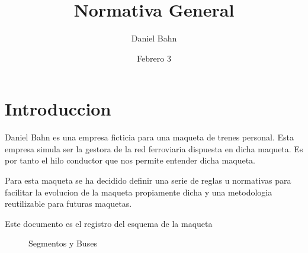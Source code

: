\documentclass{DccDiyTools/DccDiyTools}
\title{Normativa General}
\author{Daniel Bahn}
\date{Febrero 3}
\begin{document}
\maketitle
\newpage
\section{Introduccion}
Daniel Bahn es una empresa ficticia para una maqueta de trenes personal. Esta empresa simula ser la gestora de la red ferroviaria dispuesta en dicha maqueta.
Es por tanto el hilo conductor que nos permite entender dicha maqueta.

Para esta maqueta se ha decidido definir una serie de reglas u normativas para facilitar la evolucion de la maqueta propiamente dicha y una metodologia
reutilizable para futuras maquetas.

Este documento es el registro del esquema de la maqueta

\begin{figure}[H]
    \centering
    
    \caption{Segmentos y Buses}
    \label{fig:ModulosBuses}
\end{figure}
\end{document}
